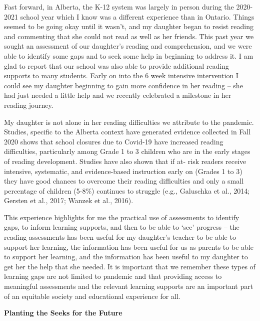 \documentclass[
]{book}
\begin{document}
Fast forward, in Alberta, the K-12 system was largely in person during the 2020-2021 school year which I know was a different experience than in Ontario. Things seemed to be going okay until it wasn't, and my daughter began to resist reading and commenting that she could not read as well as her friends. This past year we sought an assessment of our daughter's reading and comprehension, and we were able to identify some gaps and to seek some help in beginning to address it. I am glad to report that our school was also able to provide additional reading supports to many students. Early on into the 6 week intensive intervention I could see my daughter beginning to gain more confidence in her reading -- she had just needed a little help and we recently celebrated a milestone in her reading journey.

My daughter is not alone in her reading difficulties we attribute to the pandemic. Studies, specific to the Alberta context have generated evidence collected in Fall 2020 shows that school closures due to Covid-19 have increased reading difficulties, particularly among Grade 1 to 3 children who are in the early stages of reading development. Studies have also shown that if at- risk readers receive intensive, systematic, and evidence-based instruction early on (Grades 1 to 3) they have good chances to overcome their reading difficulties and only a small percentage of children (5-8\%) continues to struggle (e.g., Galuschka et al., 2014; Gersten et al., 2017; Wanzek et al., 2016).

This experience highlights for me the practical use of assessments to identify gaps, to inform learning supports, and then to be able to `see' progress -- the reading assessments has been useful for my daughter's teacher to be able to support her learning, the information has been useful for us as parents to be able to support her learning, and the information has been useful to my daughter to get her the help that she needed. It is important that we remember these types of learning gaps are not limited to pandemic and that providing access to meaningful assessments and the relevant learning supports are an important part of an equitable society and educational experience for all.

\textbf{Planting the Seeks for the Future}
\end{document}
